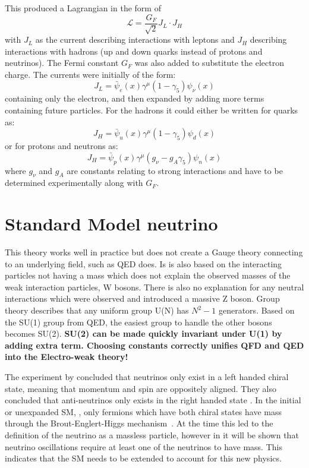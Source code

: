 This produced a Lagrangian in the form of 
\begin{equation}
\mathcal{L} = \frac{G_F}{\sqrt{2}}J_L \cdot J_H
\end{equation}
with $J_L$ as the current describing interactions with leptons and $J_H$ describing interactions with hadrons (up and down quarks instead of protons and neutrinos). The Fermi constant $G_F$ was also added to substitute the electron charge. The currents were initially of the form:
\begin{equation}
J_L = \bar{\psi}_e(x)\gamma^\mu (1-\gamma_5) \psi_\nu(x)
\end{equation}
containing only the electron, and then expanded by adding more terms containing future particles. For the hadrons it could either be written for quarks as:
\begin{equation}
J_H = \bar{\psi}_u(x)\gamma^\mu (1-\gamma_5) \psi_d(x)
\end{equation}
or for protons and neutrons as:
\begin{equation}
J_H = \bar{\psi}_p(x)\gamma^\mu (g_\nu-g_A\gamma_5) \psi_n(x)
\end{equation}
where $g_\nu$ and $g_A$ are constants relating to strong interactions and have to be determined experimentally along with $G_F$.

\section{Standard Model neutrino}\label{subsection:SMN}
This theory works well in practice but does not create a Gauge theory connecting to an underlying field, such as QED does. Is is also based on the interacting particles not having a mass which does not explain the observed masses of the weak interaction particles, W bosons. There is also no explanation for any neutral interactions which were observed and introduced a massive Z boson. Group theory describes that any uniform group U(N) has $N^2 -1$ generators. Based on the SU(1) group from QED, the easiest group to handle the other bosons becomes SU(2). \textbf{SU(2) can be made quickly invariant under U(1) by adding extra term. Choosing constants correctly unifies QFD and QED into the Electro-weak theory! }

The experiment by \citeauthor{1Helicity} concluded that neutrinos only exist in a left handed chiral state, meaning that momentum and spin are oppositely aligned. They also concluded that anti-neutrinos only exists in the right handed state \cite{1Helicity}. In the initial or unexpanded SM, \cite{34doi:10.1142/9789812562203_0002}, only fermions which have both chiral states have mass through the Brout\hyp{}Englert\hyp{}Higgs mechanism~\cite{35Higgs}. At the time this led to the definition of the neutrino as a massless particle, however in  it will be shown that neutrino oscillations require at least one of the neutrinos to have mass. This indicates that the SM needs to be extended to account for this new physics.

